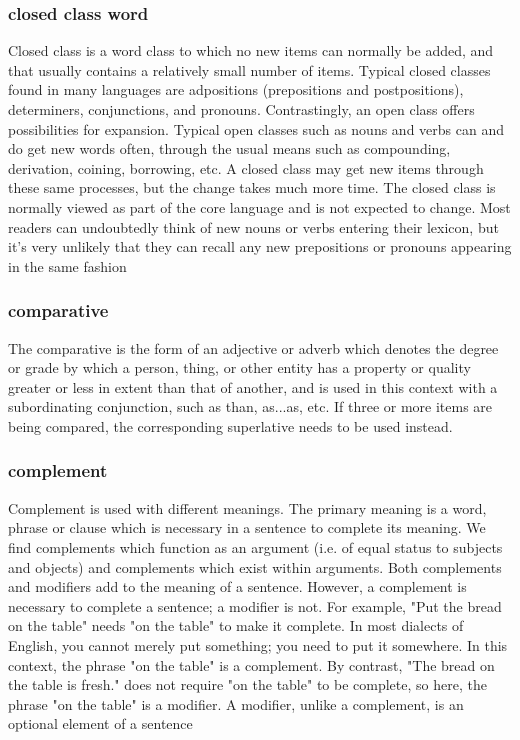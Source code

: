 \begin{small}
\subsubsection{closed class word}
Closed class is a word class to which no new items can normally be added, and that usually contains a relatively small number of items. Typical closed classes found in many languages are adpositions (prepositions and postpositions), determiners, conjunctions, and pronouns.  Contrastingly, an open class offers possibilities for expansion. Typical open classes such as nouns and verbs can and do get new words often, through the usual means such as compounding, derivation, coining, borrowing, etc.  A closed class may get new items through these same processes, but the change takes much more time. The closed class is normally viewed as part of the core language and is not expected to change. Most readers can undoubtedly think of new nouns or verbs entering their lexicon, but it's very unlikely that they can recall any new prepositions or pronouns appearing in the same fashion

\subsubsection{comparative}The comparative is the form of an adjective or adverb which denotes the degree or grade by which a person, thing, or other entity has a property or quality greater or less in extent than that of another, and is used in this context with a subordinating conjunction, such as than, as...as, etc. If three or more items are being compared, the corresponding superlative needs to be used instead.
\subsubsection{complement}Complement is used with different meanings. The primary meaning is a word, phrase or clause which is necessary in a sentence to complete its meaning. We find complements which function as an argument (i.e. of equal status to subjects and objects) and complements which exist within arguments.  Both complements and modifiers add to the meaning of a sentence. However, a complement is necessary to complete a sentence; a modifier is not. For example, "Put the bread on the table" needs "on the table" to make it complete. In most dialects of English, you cannot merely put something; you need to put it somewhere. In this context, the phrase "on the table" is a complement. By contrast, "The bread on the table is fresh." does not require "on the table" to be complete, so here, the phrase "on the table" is a modifier. A modifier, unlike a complement, is an optional element of a sentence


\end{small}
